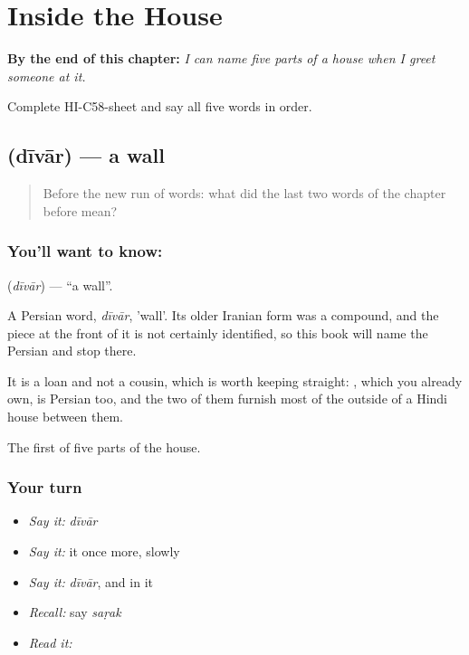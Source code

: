 
\chapter{Inside the House}
\label{ch:hi-inside-the-house}

\begin{chapteropening}
\textbf{By the end of this chapter:} \emph{I can name five parts of a house when I greet someone at it.}

Complete HI-C58-sheet and say all five words in order.
\end{chapteropening}

\section[\texorpdfstring{\hi{दीवार} (dīvār)}{दीवार (dīvār)}]{ (dīvār) — a wall}

\label{lesson:HI-C58-wall}



\begin{quote}
Before the new run of words: what did the last two words of the chapter before mean?
\end{quote}

\subsection*{You'll want to know: }
\textbf{} (\emph{dīvār}) — \textquotedblleft{}a wall\textquotedblright{}.

A Persian word, \emph{dīvār}, 'wall'. Its older Iranian form was a compound, and the piece at the front of it is not certainly identified, so this book will name the Persian and stop there.

It is a loan and not a cousin, which is worth keeping straight: , which you already own, is Persian too, and the two of them furnish most of the outside of a Hindi house between them.

\begin{grammarlens}[title={What you've built}]
The first of five parts of the house.
\end{grammarlens}

\subsection*{Your turn}
\begin{itemize}
\raggedright
  \item \emph{Say it:} \emph{dīvār}
  \item \emph{Say it:} it once more, slowly
  \item \emph{Say it:} \emph{dīvār}, and  in it
  \item \emph{Recall:} say \emph{saṛak}
  \item \emph{Read it:} \textbf{}
\end{itemize}

